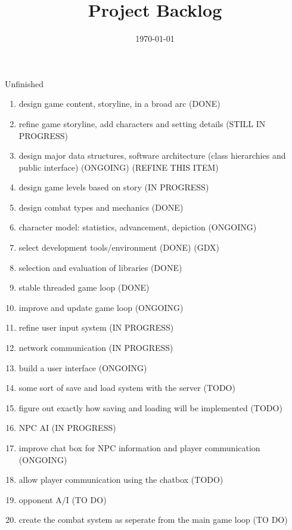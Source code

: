 \documentclass[12pt]{article}
\title{Project Backlog}
\date{\today}
\begin{document}
\maketitle

\begin{section}{Unfinished}
\begin{enumerate}



\item design game content, storyline, in a broad arc (DONE)
\item refine game storyline, add characters and setting details (STILL IN PROGRESS)

\item design major data structures, software architecture (class
	hierarchies and public interface) (ONGOING) (REFINE THIS ITEM)
	
\item design game levels based on story (IN PROGRESS)
\item design combat types and mechanics (DONE)

\item character model: statistics, advancement, depiction (ONGOING)

\item select development tools/environment (DONE) (GDX)
\item selection and evaluation of libraries (DONE)

\item stable threaded game loop (DONE)
\item improve and update game loop (ONGOING)
\item refine user input system (IN PROGRESS)
\item network communication (IN PROGRESS)
\item build a user interface (ONGOING)
\item some sort of save and load system with the server (TODO)
\item figure out exactly how saving and loading will be implemented (TODO)


\item NPC AI (IN PROGRESS)
\item improve chat box for NPC information and player communication (ONGOING)
\item allow player communication using the chatbox (TODO)
\item opponent A/I (TO DO)
\item create the combat system as seperate from the main game loop (TO DO)



\end{enumerate}
\end{section}
\end{document}
